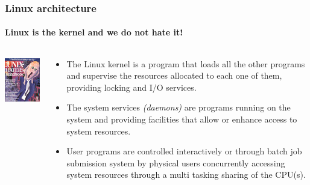 \documentclass[unknownkeysallowed, 10pt, a4 paper, handout]{beamer}
\begin{document}
\begin{frame}[label=architecture]
  \frametitle{Linux architecture}
  \framesubtitle{Linux is the kernel and we do not hate it!}
  \begin{columns}[T]
    \begin{column}{.23\textwidth}
      \vspace{7mm}
      \includegraphics[scale=0.5]{pics/UNIX-HATERS_Handbook_cover_ISBN_1-56884-203-1.png}
    \end{column}
    \begin{column}{.73\textwidth}
      \begin{itemize}
      \item The Linux kernel is a program that loads all the other programs and
        supervise the resources allocated to each one of them, providing
        locking and I/O services.
      \item The system services \emph{(daemons)} are programs running on the
        system and providing facilities that allow or enhance access to system
        resources.
      \item User programs are controlled interactively or through batch job
        submission system by physical users concurrently accessing system
        resources through a multi tasking sharing of the CPU(s).
    \end{itemize}
    \end{column}
  \end{columns}
\end{frame}


\end{document}
